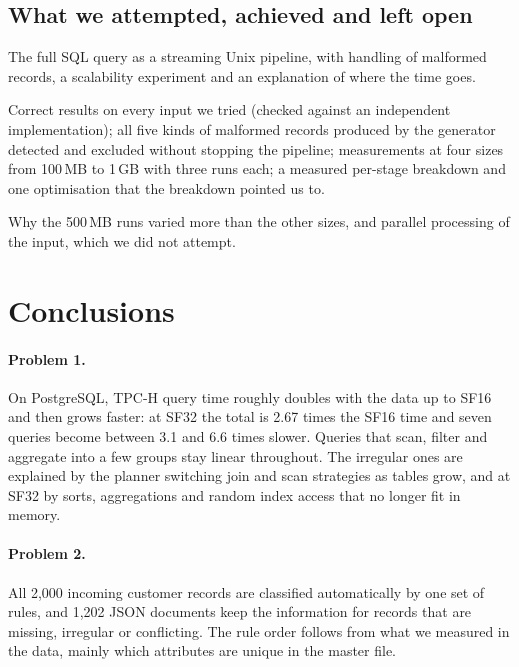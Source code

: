 \documentclass[11pt,a4paper]{article}
\begin{document}
\subsection{What we attempted, achieved and left open}

\begin{description}[style=nextline]
\item[Attempted] The full SQL query as a streaming Unix pipeline, with
handling of malformed records, a scalability experiment and an explanation of
where the time goes.
\item[Achieved] Correct results on every input we tried (checked against an
independent implementation); all five kinds of malformed records produced by
the generator detected and excluded without stopping the pipeline;
measurements at four sizes from 100\,MB to 1\,GB with three runs each; a
measured per-stage breakdown and one optimisation that the breakdown pointed
us to.
\item[Left open] Why the 500\,MB runs varied more than the other sizes, and
parallel processing of the input, which we did not attempt.
\end{description}

\section{Conclusions}
\label{sec:conclusions}

\paragraph{Problem 1.} On PostgreSQL, TPC-H query time roughly doubles with
the data up to SF16 and then grows faster: at SF32 the total is 2.67 times
the SF16 time and seven queries become between 3.1 and 6.6 times slower. Queries
that scan, filter and aggregate into a few groups stay linear throughout. The
irregular ones are explained by the planner switching join and scan
strategies as tables grow, and at SF32 by sorts, aggregations and random index
access that no longer fit in memory.

\paragraph{Problem 2.} All 2{,}000 incoming customer records are classified
automatically by one set of rules, and 1{,}202 JSON documents keep the
information for records that are missing, irregular or conflicting. The rule
order follows from what we measured in the data, mainly which attributes are
unique in the master file.
\end{document}
